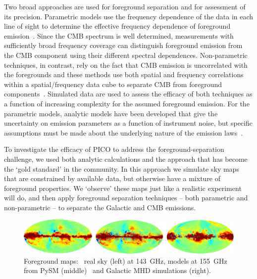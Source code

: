 \documentclass[PICOReport.tex]{subfiles}
\begin{document}
Two broad approaches are used for foreground separation and for assessment of its precision.  Parametric models use the frequency dependence of the data in each line of sight to determine the effective frequency dependence of foreground emission~\citep{parametric}.  Since the CMB spectrum is well determined, measurements with sufficiently broad frequency coverage can distinguish foreground emission from the CMB component using their different spectral dependences. Non-parametric techniques, in contrast, rely on the fact that CMB emission is uncorrelated with the foregrounds and these methods use both spatial and frequency correlations within a spatial/frequency data cube to separate CMB from foreground components~\citep{nonparametric}.  Simulated data are used to assess the efficacy of both techniques as a function of increasing complexity for the assumed foreground emission. For the parametric models, analytic models have been developed that give the uncertainty on emission parameters as a function of instrument noise, but specific assumptions must be made about the underlying nature of the emission laws~\citep{fisher}. 

To investigate the efficacy of PICO to address the foreground-separation challenge, we used both analytic calculations and the approach that has become the `gold standard' in the community. In this approach we simulate sky maps that are constrained by available data, but otherwise have a mixture of foreground properties. We  `observe' these maps just like a realistic experiment will do, and then apply foreground separation techniques -- both parametric and non-parametric -- to separate the Galactic and CMB emissions. 

\begin{figure}[t]
\begin{center}
\includegraphics[width=.95\textwidth]{images/foregrounds_maps_planck_models}
\vspace{-0.1in}
\caption{\captiontext
Foreground maps: \planck~real sky (left) at 143~GHz, models at 155~GHz from PySM (middle)~\citep{thorne2018_pysm} and Galactic MHD simulations (right). }
\label{fig:pysm_foregrounds}
\end{center}
\vspace{-0.2in}
\end{figure}
\end{document}
